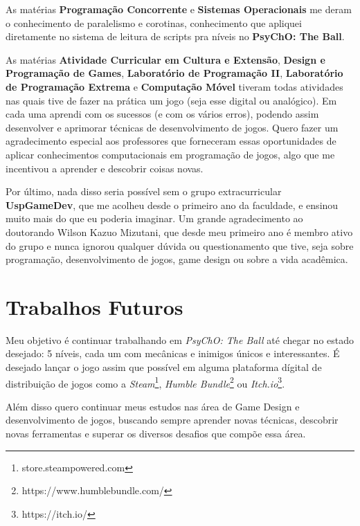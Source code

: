 As matérias \textbf{Programação Concorrente} e \textbf{Sistemas Operacionais} me deram o conhecimento de paralelismo e corotinas, conhecimento que apliquei diretamente no sistema de leitura de scripts pra níveis no \textbf{PsyChO: The Ball}.

As matérias \textbf{Atividade Curricular em Cultura e Extensão}, \textbf{Design e Programação de Games}, \textbf{Laboratório de Programação II}, \textbf{Laboratório de Programação Extrema} e \textbf{Computação Móvel} tiveram todas atividades nas quais tive de fazer na prática um jogo (seja esse digital ou analógico). Em cada uma aprendi com os sucessos (e com os vários erros), podendo assim desenvolver e aprimorar técnicas de desenvolvimento de jogos. Quero fazer um agradecimento especial aos professores que forneceram essas oportunidades de aplicar conhecimentos computacionais em programação de jogos, algo que me incentivou a aprender e descobrir coisas novas.

Por último, nada disso seria possível sem o grupo extracurricular \textbf{UspGameDev}, que me acolheu desde o primeiro ano da faculdade, e ensinou muito mais do que eu poderia imaginar. Um grande agradecimento ao doutorando Wilson Kazuo Mizutani, que desde meu primeiro ano é membro ativo do grupo e nunca ignorou qualquer dúvida ou questionamento que tive, seja sobre programação, desenvolvimento de jogos, game design ou sobre a vida acadêmica.

\section{Trabalhos Futuros}
\label{sec:trabalhos_futuros}

Meu objetivo é continuar trabalhando em \textit{PsyChO: The Ball} até chegar no estado desejado: 5 níveis, cada um com mecânicas e inimigos únicos e interessantes. É desejado lançar o jogo assim que possível em alguma plataforma dígital de distribuição de jogos como a \textit{Steam}\footnote{store.steampowered.com}, \textit{Humble Bundle}\footnote{https://www.humblebundle.com/} ou \textit{Itch.io}\footnote{https://itch.io/}.

Além disso quero continuar meus estudos nas área de Game Design e desenvolvimento de jogos, buscando sempre aprender novas técnicas, descobrir novas ferramentas e superar os diversos desafios que compõe essa área.
